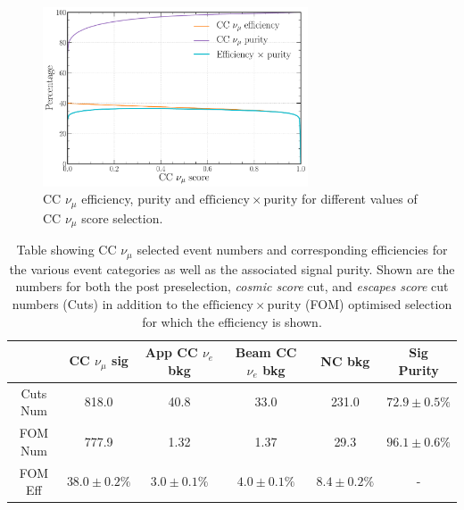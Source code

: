 \begin{figure} %
    \includegraphics[width=0.7\textwidth]{diagrams/7-results/final_numu_eff_curves.pdf}
    \caption[CC $\nu_{\mu}$ efficiency, purity and $\mathrm{efficiency}\times\mathrm{purity}$]
    {CC $\nu_{\mu}$ efficiency, purity and $\mathrm{efficiency}\times\mathrm{purity}$ for
        different values of CC $\nu_{\mu}$ score selection.}
    \label{fig:final_numu_eff_curves}
\end{figure}

\begin{table}
    \begin{tabular}{cccccc}
                 & CC $\nu_{\mu}$ sig & App CC $\nu_{e}$ bkg & Beam CC $\nu_{e}$ bkg & NC bkg        & Sig Purity     \\
        \midrule
        Cuts Num & 818.0              & 40.8                 & 33.0                  & 231.0         & $72.9\pm0.5\%$ \\
        FOM Num  & 777.9              & 1.32                 & 1.37                  & 29.3          & $96.1\pm0.6\%$ \\
        \midrule
        FOM Eff  & $38.0\pm0.2\%$     & $3.0\pm0.1\%$        & $4.0\pm0.1\%$         & $8.4\pm0.2\%$ & -              \\
    \end{tabular}
    \caption[Table showing CC $\nu_{\mu}$ selected event numbers, efficiencies and signal purity.]
    {Table showing CC $\nu_{\mu}$ selected event numbers and corresponding efficiencies for the
        various event categories as well as the associated signal purity. Shown are the numbers
        for both the post preselection, \emph{cosmic score} cut, and \emph{escapes score} cut
        numbers (Cuts) in addition to the $\mathrm{efficiency}\times\mathrm{purity}$ (FOM)
        optimised selection for which the efficiency is shown.}
    \label{tab:numu_selection}
\end{table}


